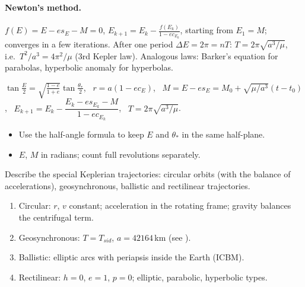 \paragraph{Newton's method.} $f(E)=E-es_E-M=0$, $E_{k+1}=E_k-\frac{f(E_k)}{1-ec_{E_k}}$, starting from $E_1=M$; converges in a few iterations.
After one period $\Delta E=2\pi=nT$: $T=2\pi\sqrt{a^3/\mu}$, i.e.\ $T^2/a^3=4\pi^2/\mu$ (3rd Kepler law). Analogous laws: Barker's equation for
parabolas, hyperbolic anomaly for hyperbolas.
\begin{keyf}
$\tan\frac E2=\sqrt{\frac{1-e}{1+e}}\tan\frac{\theta_*}2$, \ $r=a(1-ec_E)$, \ $M=E-es_E=M_0+\sqrt{\mu/a^3}(t-t_0)$, \ $E_{k+1}=E_k-\dfrac{E_k-es_{E_k}-M}{1-ec_{E_k}}$, \ $T=2\pi\sqrt{a^3/\mu}$.
\end{keyf}
\pitfalls
\begin{itemize}
\item Use the half-angle formula to keep $E$ and $\theta_*$ in the same half-plane.
\item $E$, $M$ in radians; count full revolutions separately.
\end{itemize}

\begin{qbox}
Describe the special Keplerian trajectories: circular orbits (with the balance of accelerations), geosynchronous, ballistic and rectilinear trajectories.
\end{qbox}
\begin{outline}
\begin{enumerate}
\item Circular: $r$, $v$ constant; acceleration in the rotating frame; gravity balances the centrifugal term.
\item Geosynchronous: $T=T_{sid}$, $a=42164$\,km (see ).
\item Ballistic: elliptic arcs with periapsis inside the Earth (ICBM).
\item Rectilinear: $h=0$, $e=1$, $p=0$; elliptic, parabolic, hyperbolic types.
\end{enumerate}
\end{outline}
\answer
